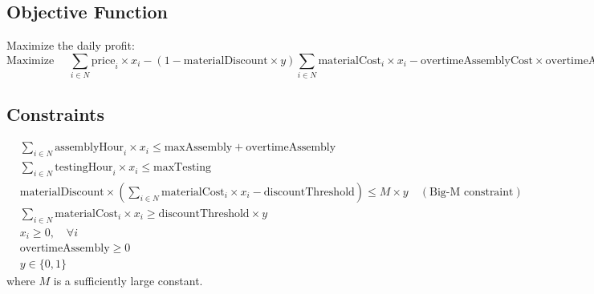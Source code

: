 \documentclass{article}
\begin{document}
\subsection*{Objective Function}
Maximize the daily profit:
\[
\text{Maximize } \quad \sum_{i \in N} \text{price}_i \times x_i - (1 - \text{materialDiscount} \times y) \sum_{i \in N} \text{materialCost}_i \times x_i - \text{overtimeAssemblyCost} \times \text{overtimeAssembly}
\]

\subsection*{Constraints}
\begin{align}
    & \sum_{i \in N} \text{assemblyHour}_i \times x_i \leq \text{maxAssembly} + \text{overtimeAssembly} \\
    & \sum_{i \in N} \text{testingHour}_i \times x_i \leq \text{maxTesting} \\
    & \text{materialDiscount} \times \left(\sum_{i \in N} \text{materialCost}_i \times x_i - \text{discountThreshold}\right) \leq M \times y \quad (\text{Big-M constraint}) \\
    & \sum_{i \in N} \text{materialCost}_i \times x_i \geq \text{discountThreshold} \times y \\
    & x_i \geq 0, \quad \forall i \\
    & \text{overtimeAssembly} \geq 0 \\
    & y \in \{0, 1\}
\end{align}
where \( M \) is a sufficiently large constant.
\end{document}
